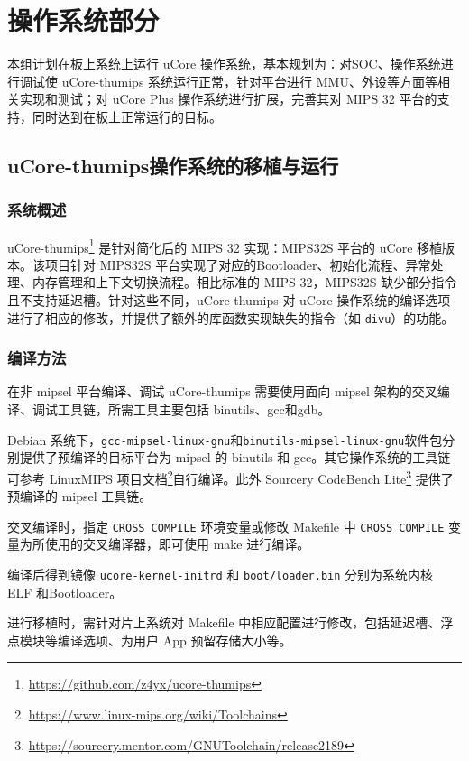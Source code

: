 \chapter{操作系统部分}
本组计划在板上系统上运行 uCore 操作系统，基本规划为：对SOC、操作系统进行调试使 uCore-thumips 系统运行正常，针对平台进行 MMU、外设等方面等相关实现和测试；对 uCore Plus 操作系统进行扩展，完善其对 MIPS 32 平台的支持，同时达到在板上正常运行的目标。

\section{uCore-thumips操作系统的移植与运行}
\label{section:ucore-thumips}
\subsection{系统概述}

uCore-thumips\footnote{\url{https://github.com/z4yx/ucore-thumips}} 是针对简化后的 MIPS 32 实现：MIPS32S 平台的 uCore 移植版本。该项目针对 MIPS32S 平台实现了对应的Bootloader、初始化流程、异常处理、内存管理和上下文切换流程。相比标准的 MIPS 32，MIPS32S 缺少部分指令且不支持延迟槽。针对这些不同，uCore-thumips 对 uCore 操作系统的编译选项进行了相应的修改，并提供了额外的库函数实现缺失的指令（如 \texttt{divu}）的功能。

\subsection{编译方法}
在非 mipsel 平台编译、调试 uCore-thumips 需要使用面向 mipsel 架构的交叉编译、调试工具链，所需工具主要包括 binutils、gcc和gdb。

Debian 系统下，\texttt{gcc-mipsel-linux-gnu}和\texttt{binutils-mipsel-linux-gnu}软件包分别提供了预编译的目标平台为 mipsel 的 binutils 和 gcc。其它操作系统的工具链可参考 LinuxMIPS 项目文档\footnote{\url{https://www.linux-mips.org/wiki/Toolchains}}自行编译。此外 Sourcery CodeBench Lite\footnote{\url{https://sourcery.mentor.com/GNUToolchain/release2189}} 提供了预编译的 mipsel 工具链。 

交叉编译时，指定 \texttt{CROSS\_COMPILE} 环境变量或修改 Makefile 中 \texttt{CROSS\_COMPILE} 变量为所使用的交叉编译器，即可使用 make 进行编译。

编译后得到镜像 \texttt{ucore-kernel-initrd} 和 \texttt{boot/loader.bin} 分别为系统内核 ELF 和Bootloader。

进行移植时，需针对片上系统对 Makefile 中相应配置进行修改，包括延迟槽、浮点模块等编译选项、为用户 App 预留存储大小等。

